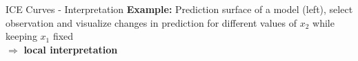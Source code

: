 \documentclass[10pt,compress,t,notes=noshow, xcolor=table]{beamer}
\begin{document}






\begin{framev}[align=top]{ICE Curves - Interpretation}
\textbf{Example:} Prediction surface of a model (left), select observation and visualize changes in prediction for different values of $x_2$ while keeping $x_1$ fixed \\ $\Rightarrow$ \textbf{local interpretation}
\\
\spacer[0.25]
\end{framev}
\end{document}
